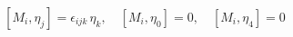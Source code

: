 \begin{equation}\label{23}
 [M_i, \eta_j] = \epsilon_{ijk}\, \eta_k, \quad [M_i,
 \eta_0]=0,\quad
[M_i, \eta_4] =0
\end{equation}


